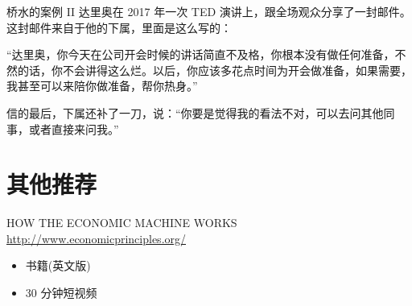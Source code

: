 \documentclass[presentation, bigger]{beamer}
\begin{document}
\begin{frame}[label={sec:orgebb01d9}]{桥水的案例 II}
达里奥在 2017 年一次 TED 演讲上，跟全场观众分享了一封邮件。这封邮件来自于他的下属，里面是这么写的：

“达里奥，你今天在公司开会时候的讲话简直不及格，你根本没有做任何准备，不然的话，你不会讲得这么烂。以后，你应该多花点时间为开会做准备，如果需要，我甚至可以来陪你做准备，帮你热身。”

信的最后，下属还补了一刀，说：“你要是觉得我的看法不对，可以去问其他同事，或者直接来问我。”
\end{frame}


\section{其他推荐}
\label{sec:org0bf76b1}
\begin{frame}[label={sec:org451a394}]{HOW THE ECONOMIC MACHINE WORKS}
\url{http://www.economicprinciples.org/}

\begin{itemize}
\item 书籍(英文版)
\item 30 分钟短视频
\end{itemize}
\end{frame}
\end{document}
